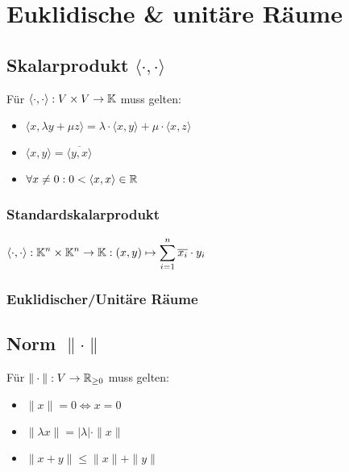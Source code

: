 \section*{Euklidische \& unitäre Räume}

\subsection*{Skalarprodukt $\langle\cdot,\cdot\rangle$}
Für $\langle\cdot,\cdot\rangle: V \times V \to \mathbb{K}$ muss gelten:
\begin{itemize}
	\item $\langle x,\lambda y + \mu z \rangle = \lambda\cdot\langle x,y\rangle + \mu\cdot\langle x,z\rangle$
	\item $\langle x,y \rangle = \overline{\langle y,x \rangle}$
	\item $\forall x\neq 0: 0 < \langle x,x \rangle \in \mathbb{R}$
\end{itemize}

\subsubsection*{Standardskalarprodukt}
$\displaystyle \langle\cdot,\cdot\rangle: \mathbb{K}^n \times \mathbb{K}^n \to \mathbb{K}: (x,y)\mapsto \sum_{i=1}^n \overline{x_i}\cdot y_i$

\subsubsection*{Euklidischer/Unitäre Räume}

\subsection*{Norm $\|\cdot\|$}
Für $\|\cdot\|:V\to\mathbb{R}_{\ge 0}$ muss gelten:
\begin{itemize}
	\item $\|x\| = 0 \iff x = 0$
	\item $\|\lambda x\|=|\lambda|\cdot\|x\|$
	\item $\|x+y\| \le \|x\| + \|y\|$
\end{itemize}
